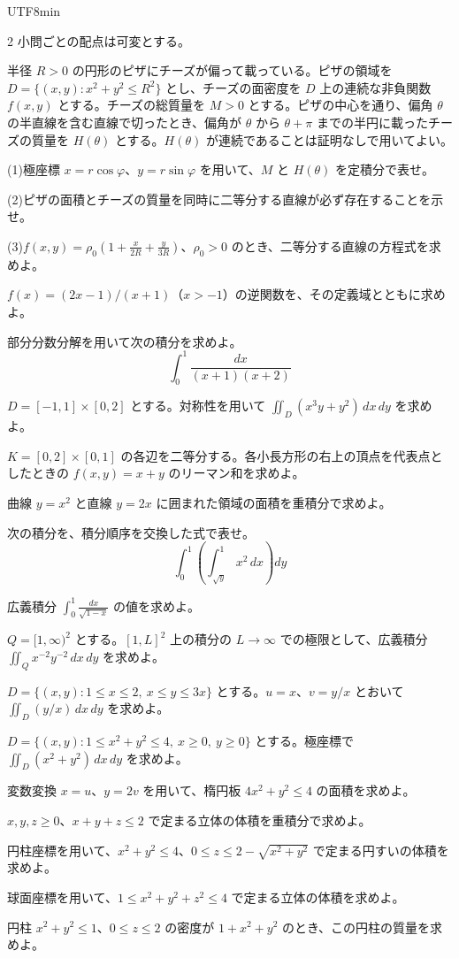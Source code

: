 \documentclass[a4paper,11pt]{article}
\begin{document}
\begin{CJK}{UTF8}{min}
\begin{multicols}{2}
小問ごとの配点は可変とする。\par
半径 $R>0$ の円形のピザにチーズが偏って載っている。ピザの領域を $D=\{(x,y):x^2+y^2\le R^2\}$ とし、チーズの面密度を $D$ 上の連続な非負関数 $f(x,y)$ とする。チーズの総質量を $M>0$ とする。ピザの中心を通り、偏角 $\theta$ の半直線を含む直線で切ったとき、偏角が $\theta$ から $\theta+\pi$ までの半円に載ったチーズの質量を $H(\theta)$ とする。$H(\theta)$ が連続であることは証明なしで用いてよい。
\par (1)\enspace 極座標 $x=r\cos\varphi$、$y=r\sin\varphi$ を用いて、$M$ と $H(\theta)$ を定積分で表せ。
\par (2)\enspace ピザの面積とチーズの質量を同時に二等分する直線が必ず存在することを示せ。
\par (3)\enspace $f(x,y)=\rho_0\left(1+\frac{x}{2R}+\frac{y}{3R}\right)$、$\rho_0>0$ のとき、二等分する直線の方程式を求めよ。

\columnbreak

$f(x)=(2x-1)/(x+1)$（$x>-1$）の逆関数を、その定義域とともに求めよ。

部分分数分解を用いて次の積分を求めよ。
$$
\int_0^1\frac{dx}{(x+1)(x+2)}
$$

$D=[-1,1]\times[0,2]$ とする。対称性を用いて $\iint_D(x^3y+y^2)\,dx\,dy$ を求めよ。

$K=[0,2]\times[0,1]$ の各辺を二等分する。各小長方形の右上の頂点を代表点としたときの $f(x,y)=x+y$ のリーマン和を求めよ。

曲線 $y=x^2$ と直線 $y=2x$ に囲まれた領域の面積を重積分で求めよ。

次の積分を、積分順序を交換した式で表せ。
$$
\int_0^1\left(\int_{\sqrt{y}}^1 x^2\,dx\right)dy
$$

広義積分 $\displaystyle\int_0^1\frac{dx}{\sqrt{1-x}}$ の値を求めよ。

$Q=[1,\infty)^2$ とする。$[1,L]^2$ 上の積分の $L\to\infty$ での極限として、広義積分 $\iint_Q x^{-2}y^{-2}\,dx\,dy$ を求めよ。

$D=\{(x,y):1\le x\le2,\ x\le y\le3x\}$ とする。$u=x$、$v=y/x$ とおいて $\iint_D(y/x)\,dx\,dy$ を求めよ。

$D=\{(x,y):1\le x^2+y^2\le4,\ x\ge0,\ y\ge0\}$ とする。極座標で $\iint_D(x^2+y^2)\,dx\,dy$ を求めよ。

変数変換 $x=u$、$y=2v$ を用いて、楕円板 $4x^2+y^2\le4$ の面積を求めよ。

$x,y,z\ge0$、$x+y+z\le2$ で定まる立体の体積を重積分で求めよ。

円柱座標を用いて、$x^2+y^2\le4$、$0\le z\le2-\sqrt{x^2+y^2}$ で定まる円すいの体積を求めよ。

球面座標を用いて、$1\le x^2+y^2+z^2\le4$ で定まる立体の体積を求めよ。

円柱 $x^2+y^2\le1$、$0\le z\le2$ の密度が $1+x^2+y^2$ のとき、この円柱の質量を求めよ。
\end{multicols}

\ifPDFTeX
\end{CJK}
\fi
\end{document}
